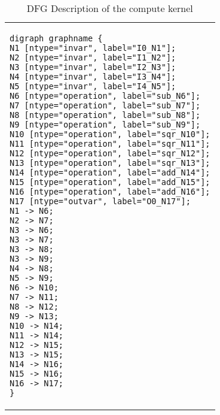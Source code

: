 \lstset{framesep=-10pt, xleftmargin=-10pt}

\begin{table}[!h]
	\centering
	\caption{DFG Description of the compute kernel}
	\label{code.tbl}
	\begin{tabular}{l}
		\begin{lstlisting}
digraph graphname {
N1 [ntype="invar", label="I0_N1"];
N2 [ntype="invar", label="I1_N2"];
N3 [ntype="invar", label="I2_N3"];
N4 [ntype="invar", label="I3_N4"];
N5 [ntype="invar", label="I4_N5"];
N6 [ntype="operation", label="sub_N6"];
N7 [ntype="operation", label="sub_N7"];
N8 [ntype="operation", label="sub_N8"];
N9 [ntype="operation", label="sub_N9"];
N10 [ntype="operation", label="sqr_N10"];
N11 [ntype="operation", label="sqr_N11"];
N12 [ntype="operation", label="sqr_N12"];
N13 [ntype="operation", label="sqr_N13"];
N14 [ntype="operation", label="add_N14"];
N15 [ntype="operation", label="add_N15"];
N16 [ntype="operation", label="add_N16"];
N17 [ntype="outvar", label="O0_N17"];
N1 -> N6;
N2 -> N7;
N3 -> N6;
N3 -> N7;
N3 -> N8;
N3 -> N9;
N4 -> N8;
N5 -> N9;
N6 -> N10;
N7 -> N11;
N8 -> N12;
N9 -> N13;
N10 -> N14;
N11 -> N14;
N12 -> N15;
N13 -> N15;
N14 -> N16;
N15 -> N16;
N16 -> N17;
}
		\end{lstlisting}\\
	\end{tabular}
\end{table}

